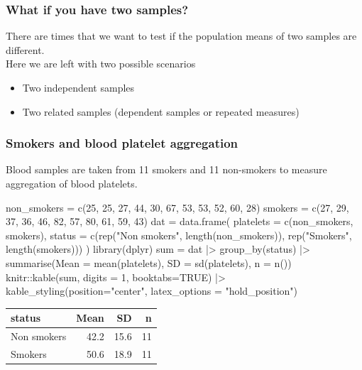 \documentclass[a4paper]{article}\usepackage[]{graphicx}\usepackage[]{xcolor}
\begin{document}
\subsubsection{What if you have two samples?}
There are times that we want to test if the population means of two samples are different.\\
Here we are left with two possible scenarios
\begin{itemize}
	\item Two independent samples
	\item Two related samples (dependent samples or repeated measures)
\end{itemize}
\subsubsection{Smokers and blood platelet aggregation}
Blood samples are taken from 11 smokers and 11 non-smokers to measure aggregation of blood platelets.
\begin{Schunk}
\begin{Sinput}
non_smokers = c(25, 25, 27, 44, 30, 67, 53, 53, 52, 60, 28)
smokers =  c(27, 29, 37, 36, 46, 82, 57, 80, 61, 59, 43)
dat = data.frame(
  platelets = c(non_smokers, smokers),
  status = c(rep("Non smokers", length(non_smokers)), 
  rep("Smokers", length(smokers)))
)
library(dplyr)
sum = dat |>
  group_by(status) |>
  	summarise(Mean = mean(platelets),
  	SD = sd(platelets), 
  	n = n())
knitr::kable(sum, digits = 1, booktabs=TRUE) |>
  kable_styling(position="center", latex_options = "hold_position")
\end{Sinput}
\begin{table}[!h]
\centering
\begin{tabular}{lrrr}
\toprule
status & Mean & SD & n\\
\midrule
Non smokers & 42.2 & 15.6 & 11\\
Smokers & 50.6 & 18.9 & 11\\
\bottomrule
\end{tabular}
\end{table}

\end{Schunk}
\end{document}
